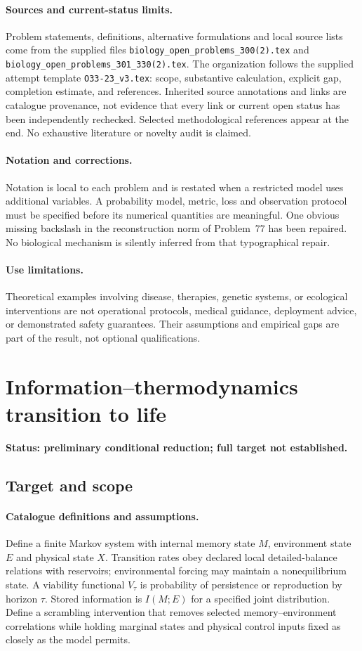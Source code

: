 \documentclass[11pt]{article}
\begin{document}
\paragraph{Sources and current-status limits.}
Problem statements, definitions, alternative formulations and local source lists
come from the supplied files
\texttt{biology\_open\_problems\_300(2).tex} and
\texttt{biology\_open\_problems\_301\_330(2).tex}.
The organization follows the supplied attempt template
\texttt{O33-23\_v3.tex}: scope, substantive calculation, explicit gap,
completion estimate, and references. Inherited source annotations and links are
catalogue provenance, not evidence that every link or current open status has
been independently rechecked. Selected methodological references appear at the
end. No exhaustive literature or novelty audit is claimed.

\paragraph{Notation and corrections.}
Notation is local to each problem and is restated when a restricted model uses
additional variables. A probability model, metric, loss and observation protocol
must be specified before its numerical quantities are meaningful. One obvious
missing backslash in the reconstruction norm of Problem~77 has been repaired.
No biological mechanism is silently inferred from that typographical repair.

\paragraph{Use limitations.}
Theoretical examples involving disease, therapies, genetic systems, or ecological
interventions are not operational protocols, medical guidance, deployment advice,
or demonstrated safety guarantees. Their assumptions and empirical gaps are part
of the result, not optional qualifications.


\section*{Information–thermodynamics transition to life}
\label{prob:298}
\noindent\textbf{Status: preliminary conditional reduction; full target not established.}
\subsection{Target and scope}
\paragraph{Catalogue definitions and assumptions.}
Define a finite Markov system with internal memory state $M$, environment state $E$ and physical state $X$. Transition rates obey declared local detailed-balance relations with reservoirs; environmental forcing may maintain a nonequilibrium state. A viability functional $V_\tau$ is probability of persistence or reproduction by horizon $\tau$. Stored information is $I(M;E)$ for a specified joint distribution. Define a scrambling intervention that removes selected memory--environment correlations while holding marginal states and physical control inputs fixed as closely as the model permits.
\end{document}

